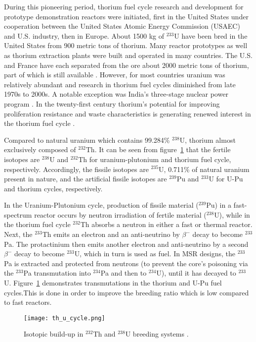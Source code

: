 During this pioneering period, thorium fuel cycle research and development for prototype demonstration reactors were initiated, first in the United States under cooperation between the United States Atomic Energy Commission (USAEC) and U.S. industry, then in Europe. About 1500 kg of $^{233}$U have been bred in the United States from 900 metric tons of thorium. Many reactor prototypes as well as thorium extraction plants were built and operated in many countries. The U.S. and France have each separated from the ore about 2000 metric tons of thorium, part of which is still available \cite{lung_perspectives_1998}. However, for most countries uranium was relatively abundant and research in thorium fuel cycles diminished from late 1970s to 2000s. A notable exception was India's three-stage nuclear power program \cite{natarajan_fast_2007}. In the twenty-first century thorium's potential for improving proliferation resistance and waste characteristics is generating renewed interest in the thorium fuel cycle \cite{bagla_thorium_2015}.

Compared to natural uranium which contains 99.284\% $^{238}$U, thorium almost exclusively composed of $^{232}$Th. It can be seen from figure~\ref{fig:th_cycle} that the fertile isotopes are $^{238}$U and $^{232}$Th for uranium-plutonium and thorium fuel cycle, respectively. Accordingly, the fissile isotopes are $^{235}$U, 0.711\% of natural uranium present in nature, and the artificial fissile isotopes are $^{239}$Pu and $^{233}$U for U-Pu and thorium cycles, respectively. 

In the Uranium-Plutonium cycle, production of fissile material ($^{239}$Pu) in a fast-spectrum reactor occurs by neutron irradiation of fertile material ($^{238}$U), while in the thorium fuel cycle $^{232}$Th absorbs a neutron in either a fast or thermal reactor. Next, the $^{233}$Th emits an electron and an anti-neutrino by $\beta^-$ decay to become $^{233}$Pa. The protactinium then emits another electron and anti-neutrino by a second $\beta^-$ decay to become $^{233}$U, which in turn is used as fuel. In \gls{MSR} designs, the $^{233}$Pa is extracted and protected from neutrons (to prevent the core's poisoning via the $^{233}$Pa transmutation into $^{234}$Pa and then to $^{234}$U), until it has decayed to $^{233}$U. Figure~\ref{fig:th_cycle} demonstrates transmutations in the thorium and U-Pu fuel cycles.This is done in order to improve the breeding ratio which is low compared to fast reactors. 

\begin{figure}[t] %
  \centering
  \vspace{-0.3em}
  \texttt{[image: th\_u\_cycle.png]}
  \caption{Isotopic build-up in $^{232}$Th and $^{238}$U breeding systems \cite{eschbach_possible_1966}.}
  \vspace{-0.6em}
  \label{fig:th_cycle}
\end{figure}
\FloatBarrier

